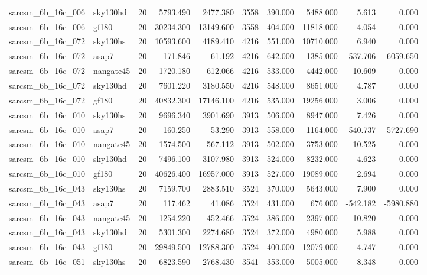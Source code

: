 \documentclass{article}
\begin{document}
\begin{longtable}{llrrrrrrrr}
sarcsm\_6b\_16c\_006 & sky130hd & 20 & 5793.490 & 2477.380 & 3558 & 390.000 & 5488.000 & 5.613 & 0.000 \\
sarcsm\_6b\_16c\_006 & gf180 & 20 & 30234.300 & 13149.600 & 3558 & 404.000 & 11818.000 & 4.054 & 0.000 \\
sarcsm\_6b\_16c\_072 & sky130hs & 20 & 10593.600 & 4189.410 & 4216 & 551.000 & 10710.000 & 6.940 & 0.000 \\
sarcsm\_6b\_16c\_072 & asap7 & 20 & 171.846 & 61.192 & 4216 & 642.000 & 1385.000 & -537.706 & -6059.650 \\
sarcsm\_6b\_16c\_072 & nangate45 & 20 & 1720.180 & 612.066 & 4216 & 533.000 & 4442.000 & 10.609 & 0.000 \\
sarcsm\_6b\_16c\_072 & sky130hd & 20 & 7601.220 & 3180.550 & 4216 & 548.000 & 8651.000 & 4.787 & 0.000 \\
sarcsm\_6b\_16c\_072 & gf180 & 20 & 40832.300 & 17146.100 & 4216 & 535.000 & 19256.000 & 3.006 & 0.000 \\
sarcsm\_6b\_16c\_010 & sky130hs & 20 & 9696.340 & 3901.690 & 3913 & 506.000 & 8947.000 & 7.426 & 0.000 \\
sarcsm\_6b\_16c\_010 & asap7 & 20 & 160.250 & 53.290 & 3913 & 558.000 & 1164.000 & -540.737 & -5727.690 \\
sarcsm\_6b\_16c\_010 & nangate45 & 20 & 1574.500 & 567.112 & 3913 & 502.000 & 3753.000 & 10.525 & 0.000 \\
sarcsm\_6b\_16c\_010 & sky130hd & 20 & 7496.100 & 3107.980 & 3913 & 524.000 & 8232.000 & 4.623 & 0.000 \\
sarcsm\_6b\_16c\_010 & gf180 & 20 & 40626.400 & 16957.000 & 3913 & 527.000 & 19089.000 & 2.694 & 0.000 \\
sarcsm\_6b\_16c\_043 & sky130hs & 20 & 7159.700 & 2883.510 & 3524 & 370.000 & 5643.000 & 7.900 & 0.000 \\
sarcsm\_6b\_16c\_043 & asap7 & 20 & 117.462 & 41.086 & 3524 & 431.000 & 676.000 & -542.182 & -5980.880 \\
sarcsm\_6b\_16c\_043 & nangate45 & 20 & 1254.220 & 452.466 & 3524 & 386.000 & 2397.000 & 10.820 & 0.000 \\
sarcsm\_6b\_16c\_043 & sky130hd & 20 & 5301.300 & 2274.680 & 3524 & 372.000 & 4980.000 & 5.988 & 0.000 \\
sarcsm\_6b\_16c\_043 & gf180 & 20 & 29849.500 & 12788.300 & 3524 & 400.000 & 12079.000 & 4.747 & 0.000 \\
sarcsm\_6b\_16c\_051 & sky130hs & 20 & 6823.590 & 2768.430 & 3541 & 353.000 & 5005.000 & 8.348 & 0.000 \\

\end{longtable}
\end{document}
